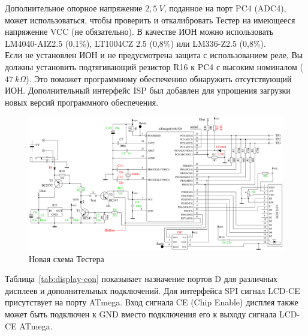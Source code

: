 Дополнительное опорное напряжение \(2,5~V\), поданное на порт PC4 (ADC4), может использоваться, чтобы проверить и 
откалибровать Тестер на имеющееся напряжение VCC (не обязательно). В качестве ИОН можно использовать LM4040-AIZ2.5 
(0,1\%), LT1004CZ 2.5 (0,8\%) или LM336-Z2.5 (0,8\%).\\

Если не установлен ИОН и не предусмотрена защита с использованием реле, Вы должны установить подтягивающий резистор 
R16 к PC4 с высоким номиналом (\(47~k\Omega\)). Это поможет программному обеспечению обнаружить отсутствующий ИОН. 
Дополнительный интерфейс ISP был добавлен для упрощения загрузки новых версий программного обеспечения.
\begin{figure}[H]
\centering
\includegraphics[width=1.0\textwidth]{../FIG/ttester.pdf}
\caption{Новая схема Тестера}
\label{fig:ttester}
\end{figure}

Таблица~\ref{tab:display-con} показывает назначение портов D для различных дисплеев и дополнительных подключений.
Для интерфейса SPI сигнал LCD-CE присутствует на порту ATmega. Вход сигнала CE (Chip Enable) дисплея также 
может быть подключен к GND вместо подключения его к выходу сигнала LCD-CE ATmega.

